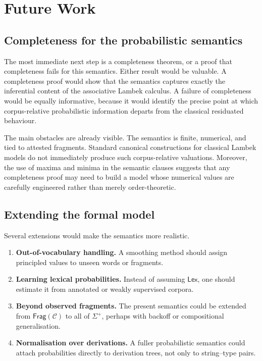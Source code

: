 \documentclass[12pt,a4paper]{report}
\theoremstyle{definition}
\newcommand{\Frag}{\mathsf{Frag}}
\newcommand{\Lex}{\mathsf{Lex}}
\begin{document}
\chapter{Future Work}

\section{Completeness for the probabilistic semantics}
The most immediate next step is a completeness theorem, or a proof that completeness fails for
this semantics. Either result would be valuable. A completeness proof would show that the
semantics captures exactly the inferential content of the associative Lambek calculus. A failure
of completeness would be equally informative, because it would identify the precise point at
which corpus-relative probabilistic information departs from the classical residuated behaviour.

The main obstacles are already visible. The semantics is finite, numerical, and tied to attested
fragments. Standard canonical constructions for classical Lambek models do not immediately
produce such corpus-relative valuations. Moreover, the use of maxima and minima in the
semantic clauses suggests that any completeness proof may need to build a model whose
numerical values are carefully engineered rather than merely order-theoretic.

\section{Extending the formal model}
Several extensions would make the semantics more realistic.
\begin{enumerate}[label=(\roman*)]
    \item \textbf{Out-of-vocabulary handling.} A smoothing method should assign principled values to
    unseen words or fragments.
    \item \textbf{Learning lexical probabilities.} Instead of assuming $\Lex$, one should estimate it from
    annotated or weakly supervised corpora.
    \item \textbf{Beyond observed fragments.} The present semantics could be extended from
    $\Frag(\mathcal C)$ to all of $\Sigma^+$, perhaps with backoff or compositional generalisation.
    \item \textbf{Normalisation over derivations.} A fuller probabilistic semantics could attach
    probabilities directly to derivation trees, not only to string--type pairs.
\end{enumerate}
\end{document}
